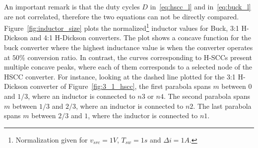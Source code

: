 An important remark is that the duty cycles $D$ in~\eqref{eq:hscc_l} and in~\eqref{eq:buck_l} are not correlated, therefore the two equations can not be directly compared.  Figure~\ref{fig:inductor_size} plots the normalized\footnote{Normalization given for $v_{src} = 1V$, $T_{sw}=1s$ and $\Delta i = 1A$.} inductor values for Buck, 3:1 H-Dickson and 4:1 H-Dickson converters. The plot shows a concave function for the buck converter where the highest inductance value is when the converter operates at $50\%$ conversion ratio. In contrast, the curves corresponding to H-SCCs present multiple concave peaks, where each of them corresponds to a selected node of the HSCC converter. For instance, looking at the dashed line plotted for the 3:1 H-Dickson converter of Figure~\ref{fig:3_1_hscc}, the first parabola spans $m$ between $0$ and $1/3$, where an inductor is connected to $n3$ or $n4$. The second parabola spans $m$ between $1/3$ and $2/3$, where an inductor is connected to $n2$. The last parabola spans $m$ between $2/3$ and $1$, where the inductor is connected to $n1$.
\begin{SCfigure}[][!h]
\centering
{}
\caption{Inductance value for Buck, 3:1 H-Dickson and 4:1 H-Dickson converters as function of the conversion ratio; results are normalized  for $V_{src} = 1V$, $T_{sw}=1s$ and $\Delta i = 1A$.}
\label{fig:inductor_size}
\end{SCfigure}

